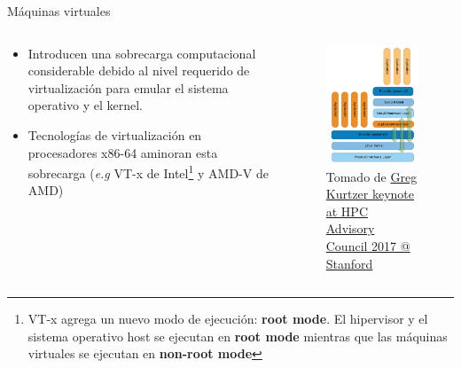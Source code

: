 \documentclass[11pt]{beamer}
\begin{document}
\begin{frame}{Máquinas virtuales}

\begin{columns}
\begin{column}{0.5\textwidth}
	\begin{itemize}
		\item Introducen una sobrecarga computacional considerable debido al nivel requerido de virtualización para emular el sistema operativo y el kernel.
		\item Tecnologías de virtualización en procesadores x86-64 aminoran esta sobrecarga (\textit{e.g} VT-x de Intel\footnote{ \scriptsize VT-x agrega un nuevo modo de ejecución: \textbf{root mode}. El hipervisor y el sistema operativo host se ejecutan en \textbf{root mode} mientras que las máquinas virtuales se ejecutan en \textbf{non-root mode}} \citep{uhlig2005intel} y AMD-V de AMD)
	\end{itemize}		

\end{column}
\begin{column}{0.5\textwidth}  %
  \vspace{-1cm}
  \begin{figure}
  	\includegraphics[scale=1.7]{images/arquitectura_vm}
  	\caption{\small Tomado de  \href{https://www.hpcadvisorycouncil.com/events/2017/stanford-workshop/pdf/GMKurtzer_Singularity_Keynote_Tuesday_02072017.pdf}{Greg Kurtzer keynote at HPC Advisory Council 2017 @ Stanford}}
  \end{figure}
\end{column}
\end{columns}
\end{frame}
\end{document}
